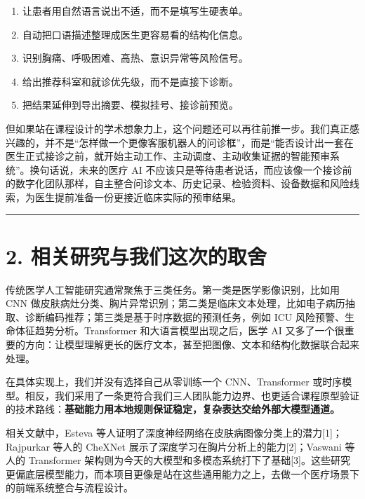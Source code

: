 \documentclass[
  chinese,
  12pt,
  UTF8,
  a4paper]{ctexart}
\providecommand{\tightlist}{%
  \setlength{\itemsep}{0pt}\setlength{\parskip}{0pt}}
\begin{document}
\begin{enumerate}
\def\labelenumi{\arabic{enumi}.}
\tightlist
\item
  让患者用自然语言说出不适，而不是填写生硬表单。
\item
  自动把口语描述整理成医生更容易看的结构化信息。
\item
  识别胸痛、呼吸困难、高热、意识异常等风险信号。
\item
  给出推荐科室和就诊优先级，而不是直接下诊断。
\item
  把结果延伸到导出摘要、模拟挂号、接诊前预览。
\end{enumerate}

但如果站在课程设计的学术想象力上，这个问题还可以再往前推一步。我们真正感兴趣的，并不是``怎样做一个更像客服机器人的问诊框''，而是``能否设计出一套在医生正式接诊之前，就开始主动工作、主动调度、主动收集证据的智能预审系统''。换句话说，未来的医疗 AI 不应该只是等待患者说话，而应该像一个接诊前的数字化团队那样，自主整合问诊文本、历史记录、检验资料、设备数据和风险线索，为医生提前准备一份更接近临床实际的预审结果。

\begin{center}\rule{0.5\linewidth}{0.5pt}\end{center}

\section{2. 相关研究与我们这次的取舍}\label{2-ux76f8ux5173ux7814ux7a76ux4e0eux6211ux4eecux8fd9ux6b21ux7684ux53d6ux820d}

传统医学人工智能研究通常聚焦于三类任务。第一类是医学影像识别，比如用 CNN 做皮肤病灶分类、胸片异常识别；第二类是临床文本处理，比如电子病历抽取、诊断编码推荐；第三类是基于时序数据的预测任务，例如 ICU 风险预警、生命体征趋势分析。Transformer 和大语言模型出现之后，医学 AI 又多了一个很重要的方向：让模型理解更长的医疗文本，甚至把图像、文本和结构化数据联合起来处理。

在具体实现上，我们并没有选择自己从零训练一个 CNN、Transformer 或时序模型。相反，我们采用了一条更符合我们三人团队能力边界、也更适合课程原型验证的技术路线：\textbf{基础能力用本地规则保证稳定，复杂表达交给外部大模型通道。}

相关文献中，Esteva 等人证明了深度神经网络在皮肤病图像分类上的潜力{[}1{]}；Rajpurkar 等人的 CheXNet 展示了深度学习在胸片分析上的能力{[}2{]}；Vaswani 等人的 Transformer 架构则为今天的大模型和多模态系统打下了基础{[}3{]}。这些研究更偏底层模型能力，而本项目更像是站在这些通用能力之上，去做一个医疗场景下的前端系统整合与流程设计。
\end{document}
